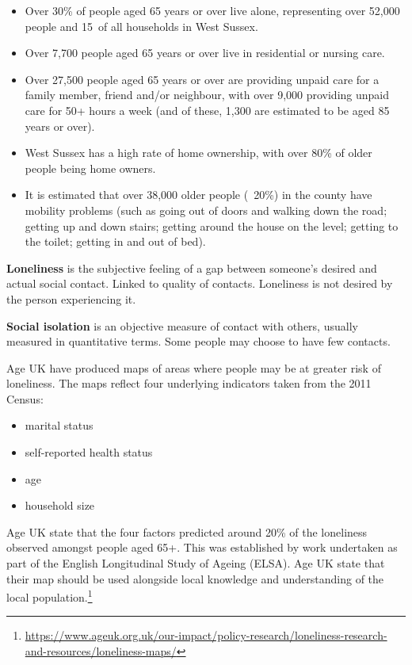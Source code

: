 \begin{itemize}[noitemsep]
    \item Over 30\% of people aged 65 years or over live alone, representing over 52,000 people and 15\ of all households in West Sussex.
    \item Over 7,700 people aged 65 years or over live in residential or nursing care.
    \item Over 27,500 people aged 65 years or over are providing unpaid care for a family member, friend and/or neighbour, with over 9,000 providing unpaid care for 50+ hours a week (and of these, 1,300 are estimated to be aged 85 years or over).
    \item West Sussex has a high rate of home ownership, with over 80\% of older people being home owners.
    \item It is estimated that over 38,000 older people (~20\%) in the county have mobility problems (such as going out of doors and walking down the road; getting up and down stairs; getting around the house on the level; getting to the toilet; getting in and out of bed).
\end{itemize}

\begin{tcolorbox}[title={Loneliness - identifying risks at a neighbourhood level}, colback={boxcolour}]
{\bf Loneliness} is the subjective feeling of a gap between someone's desired and actual social contact. Linked to quality of contacts. Loneliness is not desired by the person experiencing it.

{\bf Social isolation} is an objective measure of contact with others, usually measured in quantitative terms. Some people may choose to have few contacts.

Age UK have produced maps of areas where people may be at greater risk of loneliness. The maps reflect four underlying indicators taken from the 2011 Census: 

\begin{itemize}[noitemsep]
    \item marital status
    \item self-reported health status
    \item age
    \item household size
\end{itemize}

Age UK state that the four factors predicted around 20\% of the loneliness observed amongst people aged 65+. This was established by work undertaken as part of the English Longitudinal Study of Ageing (ELSA). Age UK state that their map should be used alongside local knowledge and understanding of the local population.\footnote{\url{https://www.ageuk.org.uk/our-impact/policy-research/loneliness-research-and-resources/loneliness-maps/}}
\end{tcolorbox}

